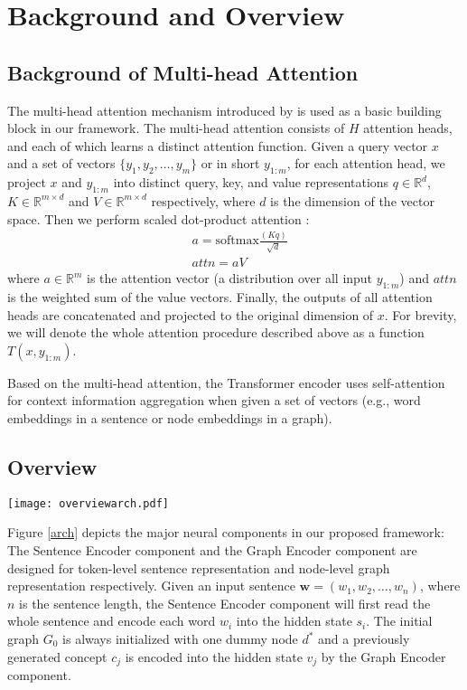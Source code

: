 \documentclass[11pt,a4paper]{article}
\begin{document}
	\section{Background and Overview}
	\label{overview}
	\subsection{Background of Multi-head Attention}
	The multi-head attention mechanism introduced by  is used as a basic building block in our framework. The multi-head attention consists of $H$ attention heads, and each of which learns a distinct attention function. Given a query vector $x$ and a set of vectors $\{y_1, y_2, \ldots, y_m\}$ or in short $y_{1:m}$, for each attention head, we project $x$ and $y_{1:m}$ into distinct query, key, and value representations $q \in \mathbb{R}^d$, $K \in \mathbb{R}^{m\times d}$ and $V \in \mathbb{R}^{m\times d}$ respectively, where $d$ is the dimension of the vector space. Then we perform scaled dot-product attention \cite{vaswani2017attention}:
	\begin{align*}
	&a = \text{softmax}\frac{(Kq)}{\sqrt{d}} \\
	&attn = a V
	\end{align*}
	where $a \in \mathbb{R}^m$ is the attention vector (a distribution over all input $y_{1:m}$) and $attn$ is the weighted sum of the value vectors. Finally, the outputs of all attention heads are concatenated and projected to the original dimension of $x$. For brevity, we will denote the whole attention procedure described above as a function $T(x,y_{1:m})$.
	
	Based on the multi-head attention, the Transformer encoder \cite{vaswani2017attention} uses self-attention for context information aggregation when given a set of vectors (e.g., word embeddings in a sentence or node embeddings in a graph).
	\subsection{Overview}
	\begin{figure*}[t]
		\centering
		\texttt{[image: overviewarch.pdf]}
		\caption{Model architecture of GSP, together with the decoding procedure at the time step $t$, where the read and write operations around the parser state $h_t$ follow the order $\textcircled{1}\rightarrow\textcircled{2}\rightarrow\textcircled{3}\rightarrow\textcircled{4}\rightarrow\textcircled{5}$.}
		\label{arch}
	\end{figure*}
	Figure \ref{arch} depicts the major neural components in our proposed framework: The Sentence Encoder component and the Graph Encoder component are designed for token-level sentence representation and node-level graph representation respectively. Given an input sentence $\mathbf{w} = (w_1, w_2, \ldots, w_n)$, where $n$ is the sentence length, the Sentence Encoder component will first read the whole sentence and encode each word $w_i$ into the hidden state $s_i$. The initial graph $G_0$ is always initialized with one dummy node $d^*$ and a previously generated concept $c_j$ is encoded into the hidden state $v_j$ by the Graph Encoder component.
	
\end{document}
